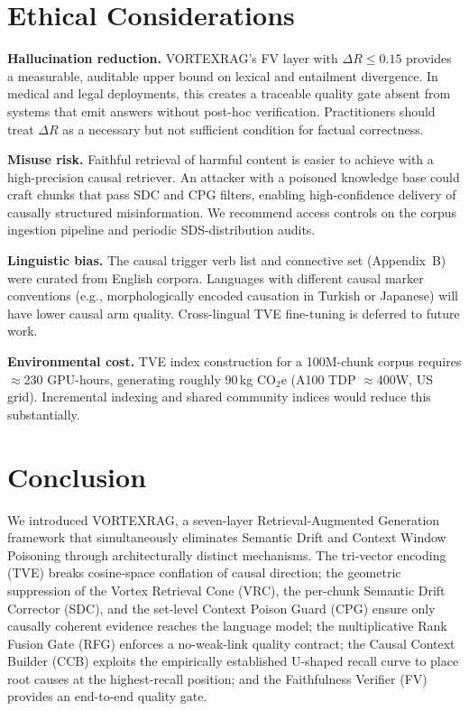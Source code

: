 \documentclass[10pt,twocolumn]{article}
\newcommand{\secvspace}{\vspace{-4pt}}
\begin{document}
\section{Ethical Considerations}\label{sec:ethics}
\secvspace

\noindent\textbf{Hallucination reduction.}
VORTEXRAG's FV layer with $\Delta R \leq 0.15$ provides a measurable, auditable
upper bound on lexical and entailment divergence.  In medical and legal
deployments, this creates a traceable quality gate absent from systems that
emit answers without post-hoc verification.  Practitioners should treat
$\Delta R$ as a necessary but not sufficient condition for factual correctness.

\noindent\textbf{Misuse risk.}
Faithful retrieval of harmful content is easier to achieve with a high-precision
causal retriever.  An attacker with a poisoned knowledge base could craft
chunks that pass SDC and CPG filters, enabling high-confidence delivery of
causally structured misinformation.  We recommend access controls on the
corpus ingestion pipeline and periodic SDS-distribution audits.

\noindent\textbf{Linguistic bias.}
The causal trigger verb list and connective set (Appendix~B) were curated
from English corpora.  Languages with different causal marker conventions
(e.g., morphologically encoded causation in Turkish or Japanese) will have
lower causal arm quality.  Cross-lingual TVE fine-tuning is deferred to
future work.

\noindent\textbf{Environmental cost.}
TVE index construction for a 100M-chunk corpus requires $\approx$230 GPU-hours,
generating roughly 90\,kg CO$_2$e (A100 TDP $\approx$400W, US grid).
Incremental indexing and shared community indices would reduce this
substantially.

\section{Conclusion}\label{sec:conclusion}
\secvspace

We introduced VORTEXRAG, a seven-layer Retrieval-Augmented Generation framework
that simultaneously eliminates Semantic Drift and Context Window Poisoning
through architecturally distinct mechanisms.  The tri-vector encoding (TVE)
breaks cosine-space conflation of causal direction; the geometric suppression
of the Vortex Retrieval Cone (VRC), the per-chunk Semantic Drift Corrector
(SDC), and the set-level Context Poison Guard (CPG) ensure only causally
coherent evidence reaches the language model; the multiplicative Rank Fusion
Gate (RFG) enforces a no-weak-link quality contract; the Causal Context Builder
(CCB) exploits the empirically established U-shaped recall curve to place
root causes at the highest-recall position; and the Faithfulness Verifier (FV)
provides an end-to-end quality gate.
\end{document}
